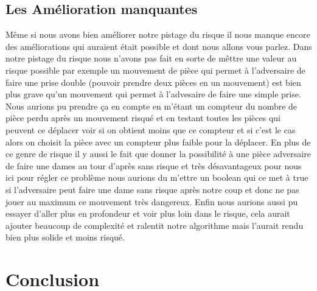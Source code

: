 \documentclass[11pt]{article} %
\begin{document}
\subsection{Les Amélioration manquantes}
Même si nous avons bien améliorer notre pistage du risque il nous manque encore des améliorations qui auraient était possible et dont nous allons vous parlez. Dans notre pistage du risque nous n'avons pas fait en sorte de mêttre une valeur au risque possible par exemple un mouvement de pièce qui permet à l'adversaire de faire une prise double (pouvoir prendre deux pièces en un mouvement) est bien plus grave qu'un mouvement qui permet à l'advesaire de faire une simple prise. Nous aurions pu prendre ça en compte en m'étant un compteur du nombre de pièce perdu après un mouvement risqué et en testant toutes les pièces qui peuvent ce déplacer voir si on obtient moins que ce compteur et si c'est le cas alors on choisit la pièce avec un compteur plus faible pour la déplacer. En plus de ce genre de risque il y aussi le fait que donner la possibilité à une pièce adversaire de faire une dames au tour d'après sans risque et très désavantageux pour nous ici pour régler ce problème nous aurions du m'ettre un boolean qui ce met à true si l'adversaire peut faire une dame sans risque après notre coup et donc ne pas jouer au maximum ce mouvement très dangereux. Enfin nous aurions aussi pu essayer d'aller plus en profondeur et voir plus loin dans le risque, cela aurait ajouter beaucoup de complexité et ralentit notre algorithme mais l'aurait rendu bien plus solide et moins risqué. 

\section{Conclusion}
\end{document}
